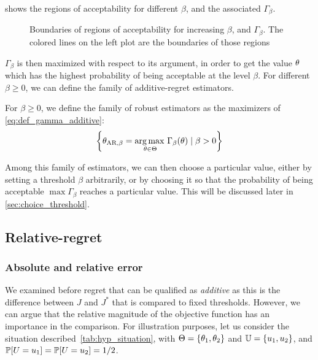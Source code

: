 \documentclass[../../Main_ManuscritThese.tex]{subfiles}
\newcommand\imgpath{/home/victor/acadwriting/Manuscrit/Text/Chapter3/img/}
\begin{document}
   shows the regions of acceptability for different $\beta$, and the associated $\Gamma_{\beta}$.

\begin{figure}[ht]
  \centering
  
  \caption[Regions of $\beta$-acceptability]{\label{fig:gamma_beta_increasing} Boundaries of regions of acceptability for increasing $\beta$, and $\Gamma_{\beta}$. The colored lines on the left plot are the boundaries of those regions}
\end{figure}


  $\Gamma_{\beta}$ is then maximized with respect to its argument, in order to get the value $\theta$ which has the highest probability of being acceptable at the level $\beta$. For different $\beta \geq 0$, we can define the family of additive-regret  estimators.

  
  \begin{definition}
    \label{def:AR_family}
    For $\beta \geq 0$, we define the family of robust estimators as the maximizers of \cref{eq:def_gamma_additive}:
    \begin{equation}
      \label{eq:def_AR_family}
      \left\{\estimtxt{\kk}{AR,\beta} = \argmax_{\kk\in\Kspace} \Gamma_{\beta}(\kk) \mid \beta > 0\right\} %
    \end{equation}
  \end{definition}
  Among this family of estimators, we can then choose a particular value, either by setting a threshold $\beta$ arbitrarily, or by choosing it so that the probability of being acceptable $\max \Gamma_{\beta}$ reaches a particular value. This will be discussed later in \cref{sec:choice_threshold}.


  \subsection{Relative-regret}
  \subsubsection{Absolute and relative error}
  \label{ssec:hyp_situation}
We examined before regret that can be qualified as \emph{additive} as this is the difference between $J$ and $J^*$ that is compared to fixed thresholds.
However, we can argue that the relative magnitude of the objective function has an importance in the comparison. For illustration purposes, let us consider the situation described~\cref{tab:hyp_situation}, with $\Theta = \{\theta_1, \theta_2\}$ and $\mathbb{U} = \{u_1, u_2\}$, and $\mathbb{P}[U = u_1] =\mathbb{P}[U = u_2]= 1/2$.
\end{document}
